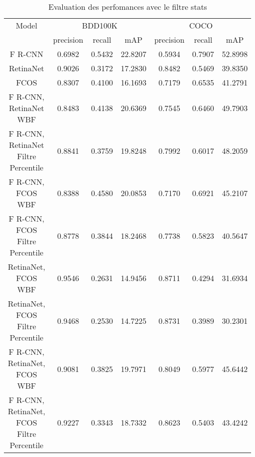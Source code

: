 \documentclass{article}
\begin{document}
\begin{table}[h!]
\centering
\begin{tabular}{|c||c|c|c||c|c|c|} 
\hline
Model & \multicolumn{3}{|c||}{BDD100K} & \multicolumn{3}{|c|}{COCO} \\ 
 & precision & recall & mAP  & precision & recall & mAP  \\ [0.5ex] 
\hline
F R-CNN & 0.6982 & 0.5432 & 22.8207 & 0.5934 & 0.7907 & 52.8998 \\ 
\hline
RetinaNet & 0.9026 & 0.3172 & 17.2830 & 0.8482 & 0.5469 & 39.8350 \\ 
\hline
FCOS & 0.8307 & 0.4100 & 16.1693 & 0.7179 & 0.6535 & 41.2791 \\ 
\hline
F R-CNN, RetinaNet WBF & 0.8483 & 0.4138 & 20.6369 & 0.7545 & 0.6460 & 49.7903 \\ 
\hline
F R-CNN, RetinaNet Filtre Percentile & 0.8841 & 0.3759 & 19.8248 & 0.7992 & 0.6017 & 48.2059 \\ 
\hline
F R-CNN, FCOS WBF & 0.8388 & 0.4580 & 20.0853 & 0.7170 & 0.6921 & 45.2107 \\ 
\hline
F R-CNN, FCOS Filtre Percentile & 0.8778 & 0.3844 & 18.2468 & 0.7738 & 0.5823 & 40.5647 \\ 
\hline
RetinaNet, FCOS WBF & 0.9546 & 0.2631 & 14.9456 & 0.8711 & 0.4294 & 31.6934 \\ 
\hline
RetinaNet, FCOS Filtre Percentile & 0.9468 & 0.2530 & 14.7225 & 0.8731 & 0.3989 & 30.2301 \\ 
\hline
F R-CNN, RetinaNet, FCOS WBF & 0.9081 & 0.3825 & 19.7971 & 0.8049 & 0.5977 & 45.6442 \\ 
\hline
F R-CNN, RetinaNet, FCOS Filtre Percentile & 0.9227 & 0.3343 & 18.7332 & 0.8623 & 0.5403 & 43.4242 \\ 
\hline
\end{tabular}
\caption{Evaluation des perfomances avec le filtre stats}
\label{table:data}
\end{table}
\end{document}
